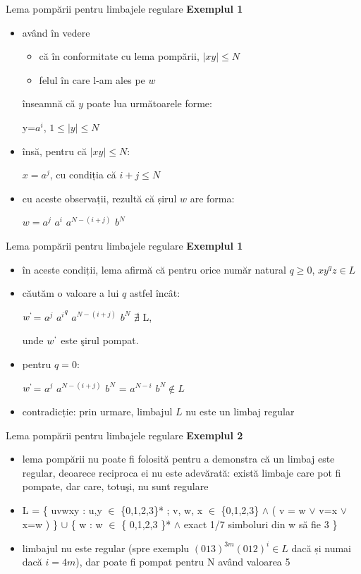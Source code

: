\documentclass[pdf]{beamer}
\begin{document}
\begin{frame}{Lema pompării pentru limbajele regulare}
\textbf{Exemplul 1}
\begin{itemize}
\item
având în vedere
\begin{itemize}
\item
că în conformitate cu lema pompării, $|xy| \le N$ 
\item
felul în care l-am ales pe $w$
\end{itemize}
înseamnă că $y$ poate lua următoarele forme:

y=$a^{i}$, $1 \leq |y| \leq N$

\item
însă, pentru că $|xy| \leq N$:

$x=a^{j}$, cu condiția că $i+j \leq N$
\item
cu aceste observații, rezultă că șirul $w$ are forma:  

$w=a^{j}$ $a^{i}$ $a^{N-(i+j)}$ $b^{N}$
\end{itemize}
\end{frame}



\begin{frame}{Lema pompării pentru limbajele regulare}
\textbf{Exemplul 1}
\begin{itemize}
\item
în aceste condiții, lema afirmă că pentru orice număr natural $q \ge 0$, $x y^q z \in L$
\item
căutăm o valoare a lui $q$ astfel încât: 

$w^{`}$= $a^{j}$ ${a^{i}}^{q}$ $a^{N-(i+j)}$ $b^{N}$ $\nexists$ L, 

unde  $w^{`}$ este şirul pompat. 
\item
pentru $q=0$: 

$w^{`}$= $a^{j}$ $a^{N-(i+j)}$ $b^{N}$ = $a^{N-i}$ $b^{N} \notin L$
\item
contradicție: prin urmare, limbajul $L$ nu este un limbaj regular
\end{itemize}
\end{frame}



\begin{frame}{Lema pompării pentru limbajele regulare}
\textbf{Exemplul 2}
\begin{itemize}
\item
lema pompării nu poate fi folosită pentru a demonstra că un limbaj este regular, deoarece reciproca ei nu este adevărată: există limbaje care pot fi pompate, dar care, totuşi, nu sunt regulare
\item
L = \{ uvwxy : u,y $\in$ \{0,1,2,3\}* ; v, w, x $\in$ \{0,1,2,3\} $\wedge$ ( v = w $\vee$ v=x $\vee$ x=w ) \} $\cup$ \{ w : w $\in$ \{ 0,1,2,3 \}* $\wedge$  exact 1/7 simboluri din w să fie 3 \}
\item
limbajul nu este regular (spre exemplu $(013)^{3m}(012)^{i} \in L$ dacă și numai dacă $i=4m$), dar poate fi pompat pentru N având valoarea 5
\end{itemize}
\end{frame}
\end{document}
